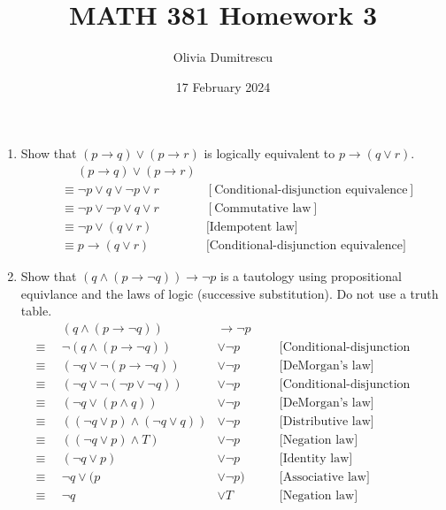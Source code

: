 \documentclass[letterpaper, 12pt]{article}
\title{MATH 381 Homework 3}
\author{Olivia Dumitrescu}
\date{17 February 2024}
\newcommand{\then}{\rightarrow}
\begin{document}
\maketitle
\begin{enumerate}
\item Show that $(p \then q) \vee (p \then r)$ is logically equivalent to $p \then (q \vee r)$.
\begin{align*}
    &\quad \; (p \then q) \vee (p \then r) & \\
    &\equiv \neg p \vee q \vee \neg p \vee r \qquad
    &[\text{Conditional-disjunction equivalence}]\\
    &\equiv \neg p \vee \neg p \vee q \vee r \qquad
    &[\text{Commutative law}]\\
    &\equiv \neg p \vee (q \vee r) \qquad
    &\text{[Idempotent law]} \\
    &\equiv p \then (q \vee r) \qquad
    &\text{[Conditional-disjunction equivalence]}
\end{align*}
\item Show that $(q \wedge (p \then \neg q)) \then \neg p$ is a tautology using propositional 
equivlance and the laws of logic (successive substitution). Do not use a truth table.
\begin{align*}
    &\quad\;& (q \wedge (p \then \neg q)) &\then \neg p \\
    &\equiv & \neg(q \wedge (p \then \neg q)) &\vee \neg p \qquad
    &\text{[Conditional-disjunction equivalence]} \\
    &\equiv & (\neg q \vee \neg(p \then \neg q)) &\vee \neg p \qquad
    &\text{[DeMorgan's law]} \\
    &\equiv & (\neg q \vee \neg(\neg p \vee \neg q)) &\vee \neg p \qquad
    &\text{[Conditional-disjunction equivalence]} \\
    &\equiv & (\neg q \vee (p \wedge q)) &\vee \neg p \qquad
    &\text{[DeMorgan's law]} \\
    &\equiv & ((\neg q \vee p) \wedge (\neg q \vee q)) &\vee \neg p \qquad
    &\text{[Distributive law]} \\
    &\equiv & ((\neg q \vee p) \wedge T) &\vee \neg p \qquad
    &\text{[Negation law]} \\
    &\equiv & (\neg q \vee p) &\vee \neg p \qquad
    &\text{[Identity law]} \\
    &\equiv & \neg q \vee (p &\vee \neg p) \qquad
    &\text{[Associative law]} \\
    &\equiv & \neg q &\vee T \qquad
    &\text{[Negation law]} \\

\end{align*}
\end{enumerate}
\end{document}
